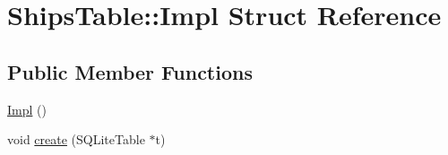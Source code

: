 \hypertarget{struct_ships_table_1_1_impl}{}\section{Ships\+Table\+::Impl Struct Reference}
\label{struct_ships_table_1_1_impl}
\subsection*{Public Member Functions}
\begin{DoxyCompactItemize}
\item 
\mbox{\hyperlink{struct_ships_table_1_1_impl_a56d409142cfcce7344864846eee9a4e4}{Impl}} ()
\item 
void \mbox{\hyperlink{struct_ships_table_1_1_impl_a5d8ab3d9855d035b7cb5eba00da54b10}{create}} (S\+Q\+Lite\+Table $\ast$t)
\end{DoxyCompactItemize}
